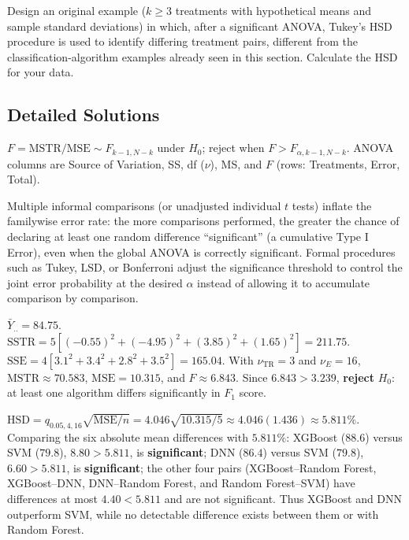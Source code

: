 \begin{problema}
\label{prob:2ed3d37}
Design an original example ($k\ge3$ treatments with hypothetical means and sample standard deviations) in which, after a significant ANOVA, Tukey's HSD procedure is used to identify differing treatment pairs, different from the classification-algorithm examples already seen in this section. Calculate the HSD for your data.
\end{problema}

\subsection*{Detailed Solutions}

\begin{solproblema}[prob:83dd109]
$F=\text{MSTR}/\text{MSE}\sim F_{k-1,N-k}$ under $H_0$; reject when $F>F_{\alpha,k-1,N-k}$. ANOVA columns are Source of Variation, SS, df ($\nu$), MS, and $F$ (rows: Treatments, Error, Total).
\end{solproblema}

\begin{solproblema}[prob:e959af7]
Multiple informal comparisons (or unadjusted individual $t$ tests) inflate the familywise error rate: the more comparisons performed, the greater the chance of declaring at least one random difference ``significant'' (a cumulative Type I Error), even when the global ANOVA is correctly significant. Formal procedures such as Tukey, LSD, or Bonferroni adjust the significance threshold to control the joint error probability at the desired $\alpha$ instead of allowing it to accumulate comparison by comparison.
\end{solproblema}

\begin{solproblema}
$\bar Y_{..}=84.75$. $\text{SSTR}=5[(-0.55)^2+(-4.95)^2+(3.85)^2+(1.65)^2]=211.75$. $\text{SSE}=4[3.1^2+3.4^2+2.8^2+3.5^2]=165.04$. With $\nu_{\text{TR}}=3$ and $\nu_E=16$, $\text{MSTR}\approx70.583$, $\text{MSE}=10.315$, and $F\approx6.843$. Since $6.843>3.239$, \textbf{reject} $H_0$: at least one algorithm differs significantly in $F_1$ score.
\end{solproblema}

\begin{solproblema}
$\text{HSD}=q_{0.05,4,16}\sqrt{\text{MSE}/n}=4.046\sqrt{10.315/5}\approx4.046(1.436)\approx5.811\%$. Comparing the six absolute mean differences with $5.811\%$: XGBoost ($88.6$) versus SVM ($79.8$), $8.80>5.811$, is \textbf{significant}; DNN ($86.4$) versus SVM ($79.8$), $6.60>5.811$, is \textbf{significant}; the other four pairs (XGBoost--Random Forest, XGBoost--DNN, DNN--Random Forest, and Random Forest--SVM) have differences at most $4.40<5.811$ and are not significant. Thus XGBoost and DNN outperform SVM, while no detectable difference exists between them or with Random Forest.
\end{solproblema}

